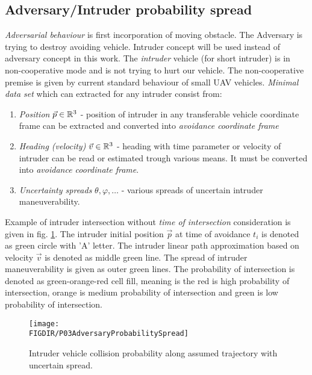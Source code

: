 \subsection{Adversary/Intruder probability spread}
\noindent \emph{Adversarial behaviour} is first incorporation of moving obstacle. The Adversary is trying to destroy avoiding vehicle. Intruder concept will be used instead of adversary concept in this work. The \emph{intruder} vehicle (for short intruder) is in non-cooperative mode and is not trying to hurt our vehicle. The non-cooperative premise is given by current standard behaviour of small UAV vehicles. \emph{Minimal data set} which can extracted for any intruder consist from:
\begin{enumerate}
    \item\emph{Position} $\vec{p}\in\mathbb{R}^3$ - position of intruder in any transferable vehicle coordinate frame can be extracted and converted into \emph{avoidance coordinate frame}
    \item\emph{Heading (velocity)} $\vec{v}\in\mathbb{R}^3$ - heading with time parameter or velocity of intruder can be read or estimated trough various means. It must be converted into \emph{avoidance coordinate frame}.
    \item\emph{Uncertainty spreads} $\theta,\varphi,\dots$ - various spreads of uncertain intruder maneuverability.
\end{enumerate}

\noindent Example of intruder intersection without \emph{time of intersection} consideration is given in fig. \ref{fig:P03AdversaryProbabilitySpread}. The intruder initial position $\vec{p}$ at time of avoidance $t_i$ is denoted as green circle with 'A' letter. The intruder linear path approximation based on velocity $\vec{v}$ is denoted as middle green line. The spread of intruder maneuverability is given as outer green lines. The probability of intersection is denoted as green-orange-red cell fill, meaning is the red is high probability of intersection, orange is medium probability of intersection and green is low probability of intersection. 

\begin{figure}[htbp]
    \centering
    \texttt{[image: \\FIGDIR/P03AdversaryProbabilitySpread]}
    \caption{Intruder vehicle collision probability along assumed trajectory with uncertain spread.}
    \label{fig:P03AdversaryProbabilitySpread}
\end{figure}

